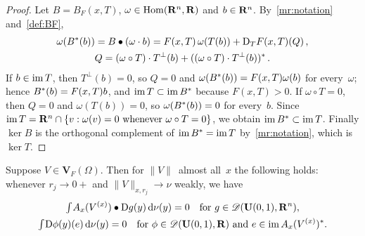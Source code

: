 \documentclass[a4paper,twoside,leqno]{article}
\begin{document}
\begin{proof}
    Let $B = B_F(x,T)$, $\omega \in \operatorname{Hom}(\mathbf{R}^{n},\mathbf{R})$ and $b \in \mathbf{R}^{n}$.
    By~\ref{mr:notation} and~\ref{def:BF},
    \begin{equation}
        \label{eq:new:kerim:1}
        \begin{gathered}
            \omega(B^{*}(b)) = B \bullet (\omega \cdot b) = F(x,T) \, \omega(T(b)) + \mathrm{D}_T
            F(x,T)(Q) \,, \\
            Q = (\omega \circ T) \cdot T^\perp(b) + ((\omega \circ T) \cdot T^\perp(b))^{*}
            \,.
        \end{gathered}
    \end{equation}
    If $b \in \operatorname{im} T$, then $T^\perp(b) = 0$, so $Q = 0$ and $\omega(B^{*}(b)) = F(x,T)
    \omega(b)$ for every~$\omega$; hence $B^{*}(b) = F(x,T) b$, and $\operatorname{im} T \subset \operatorname{im}
    B^{*}$ because $F(x,T) > 0$. If $\omega \circ T = 0$, then $Q = 0$ and $\omega(T(b)) = 0$,
    so $\omega(B^{*}(b)) = 0$ for every~$b$. Since $\operatorname{im} T = \mathbf{R}^{n} \cap \{ v :
    \omega(v) = 0 \text{ whenever } \omega \circ T = 0 \}$, we obtain $\operatorname{im} B^{*} \subset
    \operatorname{im} T$. Finally $\ker B$ is the orthogonal complement of $\operatorname{im} B^{*} = \operatorname{im} T$
    by~\ref{mr:notation}, which is $\ker T$.
\end{proof}

\begin{lemma}
    \label{ddg:2.4}
    Suppose $V \in \mathbf{V}_F(\Omega)$. Then for $\|V\|$~almost all~$x$ the following holds:
    whenever $r_j \to 0+$ and $\|V\|_{x,r_j} \to \nu$ weakly, we have
    \begin{gather}
        \label{eq:ddg:2.4:1}
        {\textstyle\int_{}^{}} A_x(V^{(x)}) \bullet \mathrm{D} g(y) \,\mathrm{d} \nu(y) = 0 \quad \text{for $g \in
        \mathscr{D}(\mathbf{U}(0,1),\mathbf{R}^{n})$}, \\
        \label{eq:ddg:2.4:2}
        {\textstyle\int_{}^{}} \mathrm{D} \phi(y)(e) \,\mathrm{d} \nu(y) = 0 \quad \text{for $\phi \in
        \mathscr{D}(\mathbf{U}(0,1),\mathbf{R})$ and $e \in \operatorname{im} A_x(V^{(x)})^{*}$}.
    \end{gather}
\end{lemma}
\end{document}

